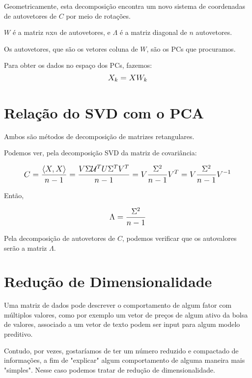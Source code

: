 \documentclass{article}
\begin{document}
Geometricamente, esta decomposição encontra um novo sistema de coordenadas de autovetores de $C$ por meio de rotações.

$W$ é a matriz $n$x$n$ de autovetores, e $\Lambda$ é a matriz diagonal de $n$ autovetores.

Os autovetores, que são os vetores coluna de $W$, são os PCs que procuramos.

Para obter os dados no espaço dos PCs, fazemos:
\begin{equation}
\mathlarger{
X_{k} = X W_k
}
\end{equation}

\pagebreak

\section{Relação do SVD com o PCA}

\hfill

Ambos são métodos de decomposição de matrizes retangulares.

Podemos ver, pela decomposição SVD da matriz de covariância:

\begin{equation}
\mathlarger{
C = \frac{\langle X, X \rangle}{n-1} = \frac{ V \Sigma \mathcal{U}^T U \Sigma^T V^T}{n-1} = V \frac{\Sigma^2}{n-1} V^T = V \frac{\Sigma^2}{n-1} V^{-1}
}
\end{equation}

Então, 

\begin{equation}
\mathlarger{
\Lambda = \frac{\Sigma^2}{n-1}
}
\end{equation}

Pela decomposição de autovetores de $C$, podemos verificar que os autovalores serão a matriz $\Lambda$.


\pagebreak


\section{Redução de Dimensionalidade}

\hfill

Uma matriz de dados pode descrever o comportamento de algum fator com múltiplos valores, como por exemplo um vetor de preços de algum ativo da bolsa de valores, associado a um vetor de texto podem ser input para algum modelo preditivo. 

Contudo, por vezes, gostaríamos de ter um número reduzido e compactado de informações, a fim de "explicar"
algum comportamento de alguma maneira mais "simples". Nesse caso podemos tratar de redução de dimensionalidade.
\end{document}
